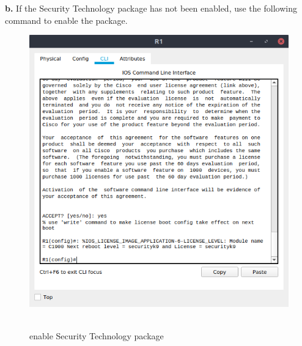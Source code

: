 \documentclass[12pt]{extarticle}
\begin{document}
\textbf{b.} If the Security Technology package has not been enabled, use the following command to enable the package.
\begin{center}
\begin{figure}[H]
\includegraphics[scale=0.7]{resources/q02b.png}\
\caption{enable Security Technology package}
\end{figure}
\end{center}
\end{document}
